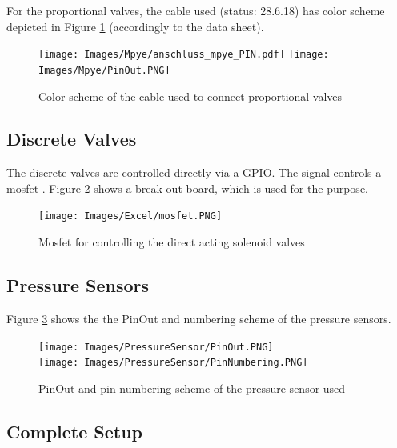 \documentclass[
	fontsize=10pt
	paper=a4
]{scrartcl}
\begin{document}
For the proportional valves, the cable used (status: 28.6.18) has color scheme depicted in Figure \ref{fig:mpye_pins} (accordingly to the data sheet\cite[p. 9]{MPYE_DATASHEET}).

\begin{figure}
\texttt{[image: Images/Mpye/anschluss\_mpye\_PIN.pdf]}
\texttt{[image: Images/Mpye/PinOut.PNG]}
\caption{Color scheme of the cable used to connect proportional valves}
\label{fig:mpye_pins}
\end{figure}




\subsection{Discrete Valves}	
The discrete valves are controlled directly via a GPIO.
The signal controls a mosfet \cite{IRF540_DATASHEET}.
Figure \ref{fig:mosfet:dvalve} shows a break-out board, which is used for the purpose.

\begin{figure}
\begin{center}
\texttt{[image: Images/Excel/mosfet.PNG]}
\end{center}
\caption{Mosfet for controlling the direct acting solenoid valves}
\label{fig:mosfet:dvalve}
\end{figure}




\subsection{Pressure Sensors}

Figure \ref{fig:psens:schmeme} shows the the PinOut and numbering scheme of the pressure sensors.

\begin{figure}
\begin{center}
\texttt{[image: Images/PressureSensor/PinOut.PNG]} \\
\texttt{[image: Images/PressureSensor/PinNumbering.PNG]}
\end{center}
\caption{PinOut and pin numbering scheme of the pressure sensor used \cite[p.19, p.30]{SSC_DATASHEET}}
\label{fig:psens:schmeme}
\end{figure}





\subsection{Complete Setup}
\end{document}
